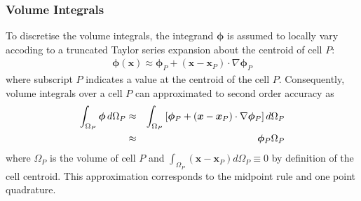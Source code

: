 \documentclass[sn-mathphys,Numbered]{sn-jnl}%
\newcommand{\bb}{\boldsymbol}
\begin{document}
\subsubsection{Volume Integrals}
To discretise the volume integrals, the integrand $\bb{\phi}$ is assumed to locally vary accoding to a truncated Taylor series expansion about the centroid of cell $P$:
\begin{eqnarray}
	\bb{\phi}(\bb{x})  \approx \bb{\phi}_P + (\bb{x} - \bb{x}_P) \cdot \nabla \bb{\phi}_P
\end{eqnarray}
where subscript $P$ indicates a value at the centroid of the cell $P$.
Consequently, volume integrals over a cell $P$ can approximated to second order accuracy as
\begin{eqnarray} \label{eq:volume_integral}
	\int_{\Omega_P} \bb{\phi} \, d \Omega_P
		&\approx& \int_{\Omega_P}  \left[ \bb{\phi}_P + (\bb{x} - \bb{x}_P) \cdot \nabla \bb{\phi}_P \right] d \Omega_P \notag \\
		&\approx& \bb{\phi}_P \Omega_P
\end{eqnarray}
where $\Omega_P$ is the volume of cell $P$ and $\int_{\Omega_P} (\bb{x} - \bb{x}_P) d\Omega_P \equiv 0$ by definition of the cell centroid.
This approximation corresponds to the midpoint rule and one point quadrature.
\end{document}
